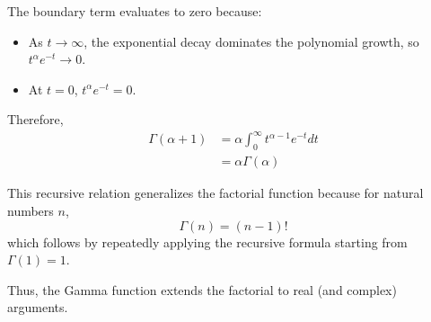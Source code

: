 The boundary term evaluates to zero because:
\begin{itemize}
    \item As \(t \to \infty\), the exponential decay dominates the polynomial growth, so \(t^\alpha e^{-t} \to 0\).
    \item At \(t = 0\), \(t^\alpha e^{-t} = 0\).
\end{itemize}

Therefore,
\begin{align}
\Gamma(\alpha + 1) &= \alpha \int_0^\infty t^{\alpha - 1} e^{-t} dt \\
&= \alpha \Gamma(\alpha)
\end{align}


This recursive relation generalizes the factorial function because for natural numbers \( n \),
\begin{equation}
\Gamma(n) = (n-1)!
\end{equation}
which follows by repeatedly applying the recursive formula starting from \(\Gamma(1) = 1\).

Thus, the Gamma function extends the factorial to real (and complex) arguments.











